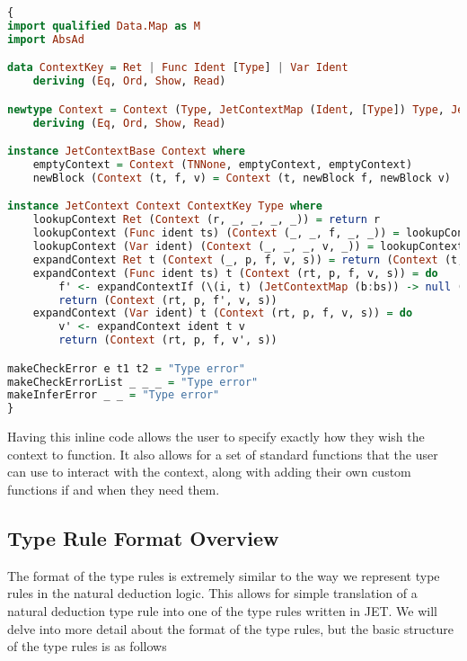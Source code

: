 \begin{minipage}{\linewidth}
\begin{lstlisting}[caption = Example of initial inline haskell code, label=lst:inlineHaskellCode, language=Haskell]
{
import qualified Data.Map as M
import AbsAd

data ContextKey = Ret | Func Ident [Type] | Var Ident
    deriving (Eq, Ord, Show, Read)

newtype Context = Context (Type, JetContextMap (Ident, [Type]) Type, JetContextMap Ident Type)
    deriving (Eq, Ord, Show, Read)

instance JetContextBase Context where
    emptyContext = Context (TNNone, emptyContext, emptyContext)
    newBlock (Context (t, f, v) = Context (t, newBlock f, newBlock v)

instance JetContext Context ContextKey Type where
    lookupContext Ret (Context (r, _, _, _, _)) = return r
    lookupContext (Func ident ts) (Context (_, _, f, _, _)) = lookupContext (ident, ts) f
    lookupContext (Var ident) (Context (_, _, _, v, _)) = lookupContext ident v
    expandContext Ret t (Context (_, p, f, v, s)) = return (Context (t, p, f, v, s))
    expandContext (Func ident ts) t (Context (rt, p, f, v, s)) = do
        f' <- expandContextIf (\(i, t) (JetContextMap (b:bs)) -> null (filter (\(i', t') -> i == i') (M.keys b))) (ident, ts) t f
        return (Context (rt, p, f', v, s))
    expandContext (Var ident) t (Context (rt, p, f, v, s)) = do
        v' <- expandContext ident t v
        return (Context (rt, p, f, v', s))

makeCheckError e t1 t2 = "Type error"
makeCheckErrorList _ _ _ = "Type error"
makeInferError _ _ = "Type error"
}
\end{lstlisting}
\end{minipage}

Having this inline code allows the user to specify exactly how they wish the context to function.
It also allows for a set of standard functions that the user can use to interact with the context, along with adding their own custom functions if and when they need them.

\subsection{Type Rule Format Overview}
The format of the type rules is extremely similar to the way we represent type rules in the natural deduction logic.
This allows for simple translation of a natural deduction type rule into one of the type rules written in JET.
We will delve into more detail about the format of the type rules, but the basic structure of the type rules is as follows

